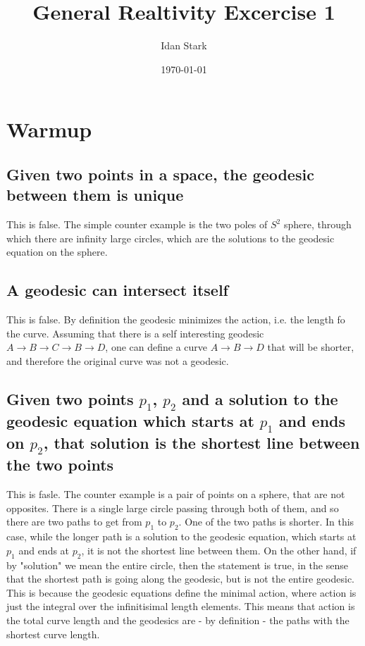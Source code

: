 \documentclass{article}
\title{General Realtivity Excercise 1}
\author{Idan Stark}
\date{\today}
\begin{document}
\maketitle

\section{Warmup}
\subsection{Given two points in a space, the geodesic between them is unique}
This is false. The simple counter example is the two poles of $S^2$ sphere, through which there are infinity large circles, which are the solutions to the geodesic equation on the sphere.
\subsection{A geodesic can intersect itself}
This is false. By definition the geodesic minimizes the action, i.e. the length fo the curve. Assuming that there is a self interesting geodesic $A \rightarrow B \rightarrow C \rightarrow B \rightarrow D$, one can define a curve $A \rightarrow B \rightarrow D$ that will be shorter, and therefore the original curve was not a geodesic.
\subsection{Given two points $p_1$, $p_2$ and a solution to the geodesic equation which starts at $p_1$ and ends on $p_2$, that
solution is the shortest line between the two points}
This is fasle. The counter example is a pair of points on a sphere, that are not opposites. There is a single large circle passing through both of them, and so there are two paths to get from $p_1$ to $p_2$. One of the two paths is shorter. In this case, while the longer path is a solution to the geodesic equation, which starts at $p_1$ and ends at $p_2$, it is not the shortest line between them.
\newline
On the other hand, if by "solution" we mean the entire circle, then the statement is true, in the sense that the shortest path is going along the geodesic, but is not the entire geodesic. This is because the geodesic equations define the minimal action, where action is just the integral over the infinitisimal length elements. This means that action is the total curve length and the geodesics are - by definition - the paths with the shortest curve length.
\end{document}
